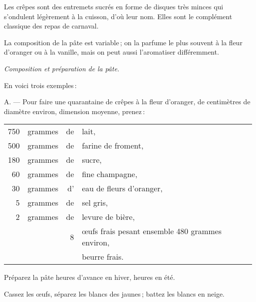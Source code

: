 Les crêpes sont des entremets sucrés en forme de disques très minces qui
s'ondulent légèrement à la cuisson, d'où leur nom. Elles sont le complément
classique des repas de carnaval.

La composition de la pâte est variable ; on la parfume le plus souvent à la
fleur d'oranger ou à la vanille, mais on peut aussi l'aromatiser différemment.

\medskip

\textit{Composition et préparation de la pâte.}

\medskip

En voici trois exemples :

\medskip

A. — Pour faire une quarantaine de crêpes à la fleur d'oranger, de {\mmm}
centimètres de diamètre environ, dimension moyenne, prenez :

\footnotesize
\begin{longtable}{rrrp{16em}}
    750 & grammes & de & lait,                                                                            \\
    500 & grammes & de & farine de froment,                                                               \\
    180 & grammes & de & sucre,                                                                           \\
     60 & grammes & de & fine champagne,                                                                  \\
     30 & grammes & d' & eau de fleurs d'oranger,                                                         \\
      5 & grammes & de & sel gris,                                                                        \\
      2 & grammes & de & levure de bière,                                                                 \\
        &         &  8 & œufs frais pesant ensemble 480 grammes environ,                                  \\
        &         &    & beurre frais.                                                                    \\
\end{longtable}
\normalsize

Préparez la pâte {\mmm} heures d'avance en hiver, {\mmm} heures en
été.

Cassez les œufs, séparez les blancs des jaunes ; battez les blancs en neige.

